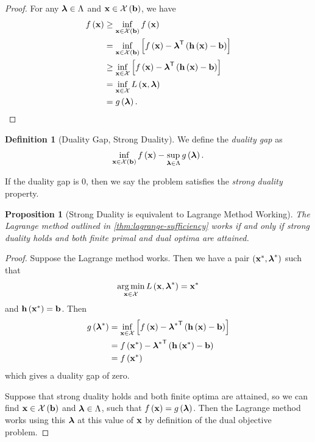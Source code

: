 \documentclass[11pt]{article}
\newtheorem{proposition}[theorem]{Proposition}
\theoremstyle{definition}
\newtheorem{definition}[theorem]{Definition}
\theoremstyle{remark}
\newcommand{\pqty}[1]{\left(#1\right)}
\newcommand{\bqty}[1]{\left[#1\right]}
\newcommand{\transpose}{^{\mathsf{T}}}
\DeclareMathOperator*{\argmin}{arg\,min}
\begin{document}
\begin{proof}
    For any \(\vb*{\lambda} \in \Lambda\) and \(\vb{x} \in \mathcal{X}\pqty{\vb{b}}\), we have
    \begin{align*}
        f\pqty{\vb{x}} &\geq \inf_{\vb{x} \in \mathcal{X} \pqty{\vb{b}}} f\pqty{\vb{x}} \\
        &= \inf_{\vb{x} \in \mathcal{X} \pqty{\vb{b}}} \bqty{f\pqty{\vb{x}} - \vb*{\lambda} \transpose \pqty{\vb{h}\pqty{\vb{x}} - \vb{b}}} \\
        &\geq \inf_{\vb{x} \in \mathcal{X}} \bqty{f\pqty{\vb{x}} - \vb*{\lambda} \transpose \pqty{\vb{h}\pqty{\vb{x}} - \vb{b}}} \\
        &= \inf_{\vb{x} \in \mathcal{X}} L\pqty{\vb{x}, \vb*{\lambda}} \\
        &= g\pqty{\vb*{\lambda}}.
    \end{align*}
\end{proof}

\begin{definition}[Duality Gap, Strong Duality]\label{optim-unit-0033}
    We define the \textit{duality gap} as
    \[
        \inf_{\vb{x} \in \mathcal{X} \pqty{\vb{b}}} f\pqty{\vb{x}} - \sup_{\vb*{\lambda} \in \Lambda} g\pqty{\vb*{\lambda}}.
    \]

    If the duality gap is \(0\), then we say the problem satisfies the \emph{strong duality} property.
\end{definition}

\begin{proposition}[Strong Duality is equivalent to Lagrange Method Working]\label{optim-unit-0034}
    The Lagrange method outlined in \autoref{thm:lagrange-sufficiency} works if and only if strong duality holds and both finite primal and dual optima are attained.
\end{proposition}

\begin{proof}
    Suppose the Lagrange method works. Then we have a pair \(\pqty{\vb{x}^{\ast}, \vb*{\lambda}^{\ast}}\) such that
    \[
        \argmin_{\vb{x} \in \mathcal{X}} L \pqty{\vb{x}, \vb*{\lambda}^{\ast}} = \vb{x}^{\ast}
    \]
    and \(\vb{h}\pqty{\vb{x}^{\ast}} = \vb{b}\). Then
    \begin{align*}
        g\pqty{\vb*{\lambda}^{\ast}} &= \inf_{\vb{x} \in \mathcal{X}} \bqty{f\pqty{\vb{x}} - {\vb*{\lambda}^{\ast}}\transpose \pqty{\vb{h}\pqty{\vb{x}} - \vb{b}}} \\
        &= f\pqty{\vb{x}^{\ast}} - {\vb*{\lambda}^{\ast}}\transpose \pqty{\vb{h\pqty{\vb{x}^{\ast}}} - \vb{b}} \\
        &= f\pqty{\vb{x}^{\ast}}
    \end{align*}
    which gives a duality gap of zero.

    Suppose that strong duality holds and both finite optima are attained, so we can find \(\vb{x} \in \mathcal{X}\pqty{\vb{b}}\) and \(\vb*{\lambda} \in \Lambda\), such that \(f\pqty{\vb{x}} = g\pqty{\vb*{\lambda}}\). Then the Lagrange method works using this \(\vb*{\lambda}\) at this value of \(\vb{x}\) by definition of the dual objective problem.
\end{proof}
\end{document}
